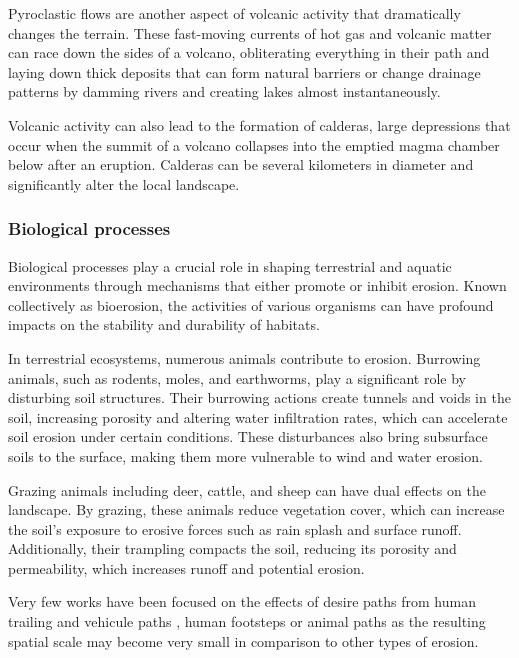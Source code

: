 Pyroclastic flows are another aspect of volcanic activity that dramatically changes the terrain. These fast-moving currents of hot gas and volcanic matter can race down the sides of a volcano, obliterating everything in their path and laying down thick deposits that can form natural barriers or change drainage patterns by damming rivers and creating lakes almost instantaneously.

Volcanic activity can also lead to the formation of calderas, large depressions that occur when the summit of a volcano collapses into the emptied magma chamber below after an eruption. Calderas can be several kilometers in diameter and significantly alter the local landscape. 

\cite{Pretorius2024}


\subsubsection{Biological processes}
Biological processes play a crucial role in shaping terrestrial and aquatic environments through mechanisms that either promote or inhibit erosion. Known collectively as bioerosion, the activities of various organisms can have profound impacts on the stability and durability of habitats.

In terrestrial ecosystems, numerous animals contribute to erosion. Burrowing animals, such as rodents, moles, and earthworms, play a significant role by disturbing soil structures. Their burrowing actions create tunnels and voids in the soil, increasing porosity and altering water infiltration rates, which can accelerate soil erosion under certain conditions. These disturbances also bring subsurface soils to the surface, making them more vulnerable to wind and water erosion. 

Grazing animals including deer, cattle, and sheep can have dual effects on the landscape. By grazing, these animals reduce vegetation cover, which can increase the soil's exposure to erosive forces such as rain splash and surface runoff. Additionally, their trampling compacts the soil, reducing its porosity and permeability, which increases runoff and potential erosion.

Very few works have been focused on the effects of desire paths from human trailing and vehicule paths \cite{Cordonnier2018,Jaiswal2019}, human footsteps \cite{Alvarado2024} or animal paths \cite{Ecormier-Nocca2021} as the resulting spatial scale may become very small in comparison to other types of erosion.

